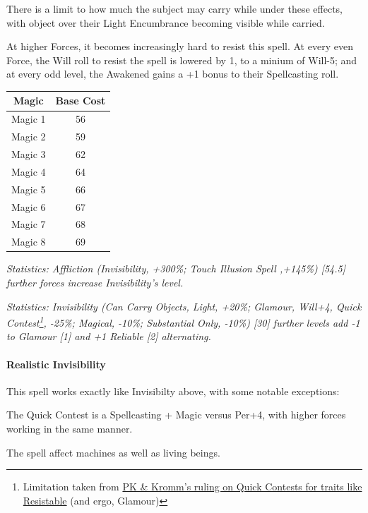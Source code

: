 \begin{multicols*}{3}
	There is a limit to how much the subject may carry while under these effects, with object over their Light Encumbrance becoming visible while carried.
	
	At higher Forces, it becomes increasingly hard to resist this spell. At every even Force, the Will roll to resist the spell is lowered by 1, to a minium of Will-5; and at every odd level, the Awakened gains a +1 bonus to their Spellcasting roll.
		
	\begin{center}
		\begin{tabular}{|c|c|}
			\hline
			Magic & Base Cost \\
			\hline
			\hline
			Magic 1 & 56 \\
			Magic 2 & 59 \\
			Magic 3 & 62 \\
			Magic 4 & 64 \\
			Magic 5 & 66 \\
			Magic 6 & 67 \\
			Magic 7 & 68 \\
			Magic 8 & 69 \\
			\hline
		\end{tabular}
	\end{center}
	
	\textcolor{OliveGreen}{\textit{Statistics: Affliction (Invisibility, +300\%; Touch Illusion Spell ,+145\%) [54.5]  further forces increase Invisibility's level. }}
	
	\textcolor{OliveGreen}{\textit{Statistics: Invisibility (Can Carry Objects, Light, +20\%; Glamour, Will+4, Quick Contest\footnote{Limitation taken from \textcolor{Blue}{\href{http://forums.sjgames.com/showpost.php?p=669736&postcount=2}{PK \& Kromm's ruling on Quick Contests for traits like Resistable}} (and ergo, Glamour)}, -25\%; Magical, -10\%; Substantial Only, -10\%) [30] further levels add -1 to Glamour [1] and +1 Reliable [2] alternating.}}
	
	\paragraph{Realistic Invisibility}
	
	This spell works exactly like Invisibilty above, with some notable exceptions:
	
	The Quick Contest is a Spellcasting + Magic versus Per+4, with higher forces working in the same manner.
	
	The spell affect machines as well as living beings.
	

\end{multicols*}

